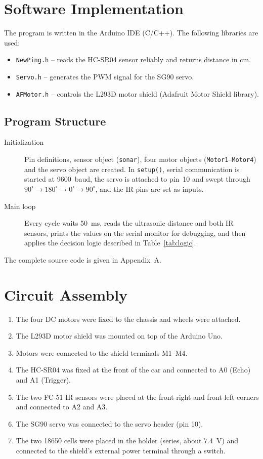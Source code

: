 \documentclass[12pt,a4paper]{article}
\begin{document}
\section{Software Implementation}
The program is written in the Arduino IDE (C/C++). The following libraries are used:
\begin{itemize}
  \item \texttt{NewPing.h} -- reads the HC-SR04 sensor reliably and returns distance in cm.
  \item \texttt{Servo.h} -- generates the PWM signal for the SG90 servo.
  \item \texttt{AFMotor.h} -- controls the L293D motor shield (Adafruit Motor Shield library).
\end{itemize}

\subsection{Program Structure}
\begin{description}
  \item[Initialization] Pin definitions, sensor object (\texttt{sonar}), four motor objects (\texttt{Motor1}--\texttt{Motor4}) and the servo object are created. In \texttt{setup()}, serial communication is started at 9600~baud, the servo is attached to pin~10 and swept through $90^\circ \rightarrow 180^\circ \rightarrow 0^\circ \rightarrow 90^\circ$, and the IR pins are set as inputs.
  \item[Main loop] Every cycle waits 50~ms, reads the ultrasonic distance and both IR sensors, prints the values on the serial monitor for debugging, and then applies the decision logic described in Table~\ref{tab:logic}.
\end{description}

The complete source code is given in Appendix~A.

\section{Circuit Assembly}
\begin{enumerate}
  \item The four DC motors were fixed to the chassis and wheels were attached.
  \item The L293D motor shield was mounted on top of the Arduino Uno.
  \item Motors were connected to the shield terminals M1--M4.
  \item The HC-SR04 was fixed at the front of the car and connected to A0 (Echo) and A1 (Trigger).
  \item The two FC-51 IR sensors were placed at the front-right and front-left corners and connected to A2 and A3.
  \item The SG90 servo was connected to the servo header (pin 10).
  \item The two 18650 cells were placed in the holder (series, about 7.4~V) and connected to the shield's external power terminal through a switch.
\end{enumerate}
\end{document}
